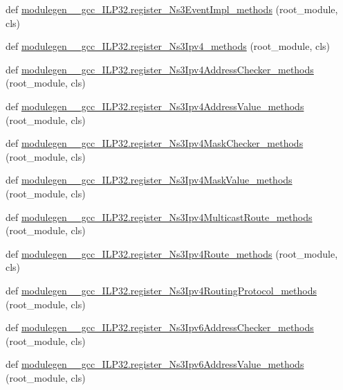 \begin{DoxyCompactItemize}
\item 
def \hyperlink{namespacemodulegen____gcc__ILP32_a600366111aadb7115136bfec5f8675e7}{modulegen\+\_\+\+\_\+gcc\+\_\+\+I\+L\+P32.\+register\+\_\+\+Ns3\+Event\+Impl\+\_\+methods} (root\+\_\+module, cls)
\item 
def \hyperlink{namespacemodulegen____gcc__ILP32_a077ea4d18572872215464cba2de484be}{modulegen\+\_\+\+\_\+gcc\+\_\+\+I\+L\+P32.\+register\+\_\+\+Ns3\+Ipv4\+\_\+methods} (root\+\_\+module, cls)
\item 
def \hyperlink{namespacemodulegen____gcc__ILP32_a91bc88170d5111bf6c9c0defc82f9018}{modulegen\+\_\+\+\_\+gcc\+\_\+\+I\+L\+P32.\+register\+\_\+\+Ns3\+Ipv4\+Address\+Checker\+\_\+methods} (root\+\_\+module, cls)
\item 
def \hyperlink{namespacemodulegen____gcc__ILP32_a9b966337400674f232afe6830aa55a11}{modulegen\+\_\+\+\_\+gcc\+\_\+\+I\+L\+P32.\+register\+\_\+\+Ns3\+Ipv4\+Address\+Value\+\_\+methods} (root\+\_\+module, cls)
\item 
def \hyperlink{namespacemodulegen____gcc__ILP32_a0c8c90b61f4e832ecf41510f18e20e98}{modulegen\+\_\+\+\_\+gcc\+\_\+\+I\+L\+P32.\+register\+\_\+\+Ns3\+Ipv4\+Mask\+Checker\+\_\+methods} (root\+\_\+module, cls)
\item 
def \hyperlink{namespacemodulegen____gcc__ILP32_aa0677871460e65b32fe90ab9bef43b9f}{modulegen\+\_\+\+\_\+gcc\+\_\+\+I\+L\+P32.\+register\+\_\+\+Ns3\+Ipv4\+Mask\+Value\+\_\+methods} (root\+\_\+module, cls)
\item 
def \hyperlink{namespacemodulegen____gcc__ILP32_aa93a16e7a72c978a7034412cb05f9964}{modulegen\+\_\+\+\_\+gcc\+\_\+\+I\+L\+P32.\+register\+\_\+\+Ns3\+Ipv4\+Multicast\+Route\+\_\+methods} (root\+\_\+module, cls)
\item 
def \hyperlink{namespacemodulegen____gcc__ILP32_a303d7e1a178cee3178333d7ca3d66d93}{modulegen\+\_\+\+\_\+gcc\+\_\+\+I\+L\+P32.\+register\+\_\+\+Ns3\+Ipv4\+Route\+\_\+methods} (root\+\_\+module, cls)
\item 
def \hyperlink{namespacemodulegen____gcc__ILP32_a7bf8c7c8ff9531971d969c676db916ff}{modulegen\+\_\+\+\_\+gcc\+\_\+\+I\+L\+P32.\+register\+\_\+\+Ns3\+Ipv4\+Routing\+Protocol\+\_\+methods} (root\+\_\+module, cls)
\item 
def \hyperlink{namespacemodulegen____gcc__ILP32_aed7bbb9a518f22e7091964769eb4c4d3}{modulegen\+\_\+\+\_\+gcc\+\_\+\+I\+L\+P32.\+register\+\_\+\+Ns3\+Ipv6\+Address\+Checker\+\_\+methods} (root\+\_\+module, cls)
\item 
def \hyperlink{namespacemodulegen____gcc__ILP32_a94efe88582382700df8f33c69780357b}{modulegen\+\_\+\+\_\+gcc\+\_\+\+I\+L\+P32.\+register\+\_\+\+Ns3\+Ipv6\+Address\+Value\+\_\+methods} (root\+\_\+module, cls)

\end{DoxyCompactItemize}
